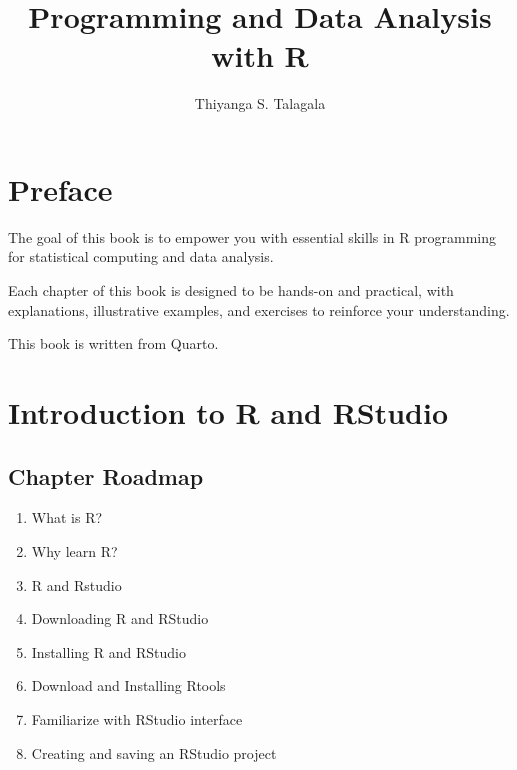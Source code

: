 \documentclass[
  letterpaper,
  DIV=11,
  numbers=noendperiod]{scrreprt}
\title{Programming and Data Analysis with R}
\author{Thiyanga S. Talagala}
\date{}
\renewcommand*\contentsname{Table of contents}
\newcommand\contentsname{Table of contents}
\begin{document}
\maketitle
\ifdefined\Shaded\renewenvironment{Shaded}{\begin{tcolorbox}[enhanced, sharp corners, breakable, borderline west={3pt}{0pt}{shadecolor}, interior hidden, boxrule=0pt, frame hidden]}{\end{tcolorbox}}\fi

\renewcommand*\contentsname{Table of contents}
{
\hypersetup{linkcolor=}
\setcounter{tocdepth}{2}
\tableofcontents
}

\hypertarget{preface}{%
\chapter*{Preface}\label{preface}}


The goal of this book is to empower you with essential skills in R
programming for statistical computing and data analysis.

Each chapter of this book is designed to be hands-on and practical, with
explanations, illustrative examples, and exercises to reinforce your
understanding.

This book is written from Quarto.


\hypertarget{introduction-to-r-and-rstudio}{%
\chapter{Introduction to R and
RStudio}\label{introduction-to-r-and-rstudio}}

\hypertarget{chapter-roadmap}{%
\section{Chapter Roadmap}\label{chapter-roadmap}}

\begin{enumerate}
\def\labelenumi{\arabic{enumi}.}
\item
  What is R?
\item
  Why learn R?
\item
  R and Rstudio
\item
  Downloading R and RStudio
\item
  Installing R and RStudio
\item
  Download and Installing Rtools
\item
  Familiarize with RStudio interface
\item
  Creating and saving an RStudio project
\end{enumerate}
\end{document}

